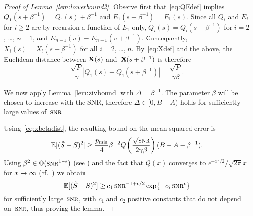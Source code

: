 \begin{proof}[Proof of Lemma~\ref{lem:lowerbound2}]
  Observe first that~\eqref{eq:QEdef} implies $Q_1(s + \beta^{-1}) = Q_1(s) +
  \beta^{-1}$ and $E_1(s + \beta^{-1}) = E_1(s)$. Since all $Q_i$ and $E_i$ for
  $i \ge 2$ are by recursion a function of $E_1$ only, $Q_i(s) = Q_i(s +
  \beta^{-1})$ for $i = 2$, \dots, $n-1$, and $E_{n-1}(s) = E_{n-1}(s +
  \beta^{-1})$. Consequently,  $X_i(s) = X_i(s + \beta^{-1})$ for all $i =
  2$, \dots, $n$. By~\eqref{eq:Xdef} and the above, the Euclidean distance
  between $\mathbf{X}(s)$ and~$\mathbf{X}(s+\beta^{-1})$ is therefore
  \begin{equation}
    \label{eq:xbetadist}
    \frac{\sqrt P}{\gamma} |Q_1(s) - Q_1(s+\beta^{-1})| 
    = \frac{\sqrt P}{\gamma\beta}.
  \end{equation}

  We now apply Lemma~\ref{lem:zivbound} with $\Delta = \beta^{-1}$. The
  parameter $\beta$ will be chosen to increase with the SNR, therefore $\Delta
  \in [0, B-A)$ holds for sufficiently large values of~$\snr$.

  Using~\eqref{eq:xbetadist}, the resulting bound on the mean squared error is
  \begin{equation*}
    \mse \ge \frac{\pmin}{4} \beta^{-2}
    Q\left (\frac{\sqrt{\snr}}{2\gamma\beta}  \right) (B-A-\beta^{-1}
    ).
  \end{equation*}
  Using $\beta^2 \in \Theta(\snr^{1-\e})$ (see ) and the
  fact that $Q(x)$ converges to $e^{-x^2/2}/\sqrt{2\pi}x$ for $x \rightarrow \infty$
  (cf.~\cite[\Spg~26.2.12]{AbramowitzS1964}) we obtain
  \begin{equation*}
    \mse \ge c_1 \snr^{-1 + \e/2} \exp\{-c_2\snr^\e\}
  \end{equation*}
  for sufficiently large~$\snr$, with $c_1$ and $c_2$ positive constants that do
  not depend on~$\snr$, thus proving the lemma.
\end{proof}

